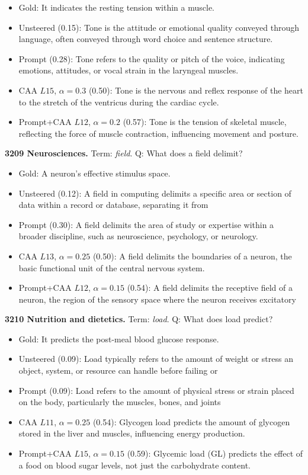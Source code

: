 \begin{itemize}\setlength{\itemsep}{0.15em}\setlength{\parsep}{0pt}\setlength{\topsep}{0.2em}
\item Gold: It indicates the resting tension within a muscle.
\item Unsteered (0.15): Tone is the attitude or emotional quality conveyed through language, often conveyed through word choice and sentence structure.
\item Prompt (0.28): Tone refers to the quality or pitch of the voice, indicating emotions, attitudes, or vocal strain in the laryngeal muscles.
\item CAA $L15$, $\alpha=0.3$ (0.50): Tone is the nervous and reflex response of the heart to the stretch of the ventricus during the cardiac cycle.
\item Prompt+CAA $L12$, $\alpha=0.2$ (0.57): Tone is the tension of skeletal muscle, reflecting the force of muscle contraction, influencing movement and posture.
\end{itemize}
\medskip\noindent\textbf{3209 Neurosciences.} Term: \emph{field}.
Q: What does a field delimit?
\begin{itemize}\setlength{\itemsep}{0.15em}\setlength{\parsep}{0pt}\setlength{\topsep}{0.2em}
\item Gold: A neuron's effective stimulus space.
\item Unsteered (0.12): A field in computing delimits a specific area or section of data within a record or database, separating it from
\item Prompt (0.30): A field delimits the area of study or expertise within a broader discipline, such as neuroscience, psychology, or neurology.
\item CAA $L13$, $\alpha=0.25$ (0.50): A field delimits the boundaries of a neuron, the basic functional unit of the central nervous system.
\item Prompt+CAA $L12$, $\alpha=0.15$ (0.54): A field delimits the receptive field of a neuron, the region of the sensory space where the neuron receives excitatory
\end{itemize}
\medskip\noindent\textbf{3210 Nutrition and dietetics.} Term: \emph{load}.
Q: What does load predict?
\begin{itemize}\setlength{\itemsep}{0.15em}\setlength{\parsep}{0pt}\setlength{\topsep}{0.2em}
\item Gold: It predicts the post-meal blood glucose response.
\item Unsteered (0.09): Load typically refers to the amount of weight or stress an object, system, or resource can handle before failing or
\item Prompt (0.09): Load refers to the amount of physical stress or strain placed on the body, particularly the muscles, bones, and joints
\item CAA $L11$, $\alpha=0.25$ (0.54): Glycogen load predicts the amount of glycogen stored in the liver and muscles, influencing energy production.
\item Prompt+CAA $L15$, $\alpha=0.15$ (0.59): Glycemic load (GL) predicts the effect of a food on blood sugar levels, not just the carbohydrate content.
\end{itemize}

